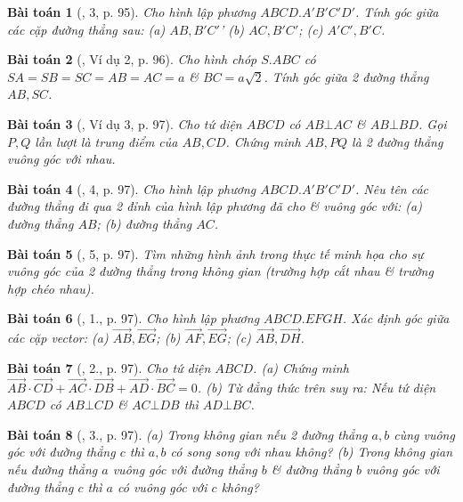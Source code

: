 \documentclass{article}
\numberwithin{equation}{section}
\newtheorem{baitoan}{Bài toán}
\begin{document}
\begin{baitoan}[\cite{SGK_Toan_11_hinh_hoc_co_ban}, 3, p. 95]
	Cho hình lập phương $ABCD.A'B'C'D'$. Tính góc giữa các cặp đường thẳng sau: (a) $AB,B'C'$' (b) $AC,B'C'$; (c) $A'C',B'C$.
\end{baitoan}

\begin{baitoan}[\cite{SGK_Toan_11_hinh_hoc_co_ban}, Ví dụ 2, p. 96]
	Cho hình chóp $S.ABC$ có $SA = SB = SC = AB = AC = a$ \& $BC = a\sqrt{2}$. Tính góc giữa 2 đường thẳng $AB,SC$.
\end{baitoan}

\begin{baitoan}[\cite{SGK_Toan_11_hinh_hoc_co_ban}, Ví dụ 3, p. 97]
	Cho tứ diện $ABCD$ có $AB\bot AC$ \& $AB\bot BD$. Gọi $P,Q$ lần lượt là trung điểm của $AB,CD$. Chứng minh $AB,PQ$ là 2 đường thẳng vuông góc với nhau.
\end{baitoan}

\begin{baitoan}[\cite{SGK_Toan_11_hinh_hoc_co_ban}, 4, p. 97]
	Cho hình lập phương $ABCD.A'B'C'D'$. Nêu tên các đường thẳng đi qua 2 đỉnh của hình lập phương đã cho \& vuông góc với: (a) đường thẳng $AB$; (b) đường thẳng $AC$.
\end{baitoan}

\begin{baitoan}[\cite{SGK_Toan_11_hinh_hoc_co_ban}, 5, p. 97]
	Tìm những hình ảnh trong thực tế minh họa cho sự vuông góc của 2 đường thẳng trong không gian (trường hợp cắt nhau \& trường hợp chéo nhau).
\end{baitoan}

\begin{baitoan}[\cite{SGK_Toan_11_hinh_hoc_co_ban}, 1., p. 97]
	Cho hình lập phương $ABCD.EFGH$. Xác định góc giữa các cặp vector: (a) $\overrightarrow{AB},\overrightarrow{EG}$; (b) $\overrightarrow{AF},\overrightarrow{EG}$; (c) $\overrightarrow{AB},\overrightarrow{DH}$.
\end{baitoan}

\begin{baitoan}[\cite{SGK_Toan_11_hinh_hoc_co_ban}, 2., p. 97]
	Cho tứ diện $ABCD$. (a) Chứng minh $\overrightarrow{AB}\cdot\overrightarrow{CD} + \overrightarrow{AC}\cdot\overrightarrow{DB} + \overrightarrow{AD}\cdot\overrightarrow{BC} = 0$. (b) Từ đẳng thức trên suy ra: Nếu tứ diện $ABCD$ có $AB\bot CD$ \& $AC\bot DB$ thì $AD\bot BC$.
\end{baitoan}

\begin{baitoan}[\cite{SGK_Toan_11_hinh_hoc_co_ban}, 3., p. 97]
	(a) Trong không gian nếu 2 đường thẳng $a,b$ cùng vuông góc với đường thẳng $c$ thì $a,b$ có song song với nhau không? (b) Trong không gian nếu đường thẳng $a$ vuông góc với đường thẳng $b$ \& đường thẳng $b$ vuông góc với đường thẳng $c$ thì $a$ có vuông góc với $c$ không?
\end{baitoan}
\end{document}
